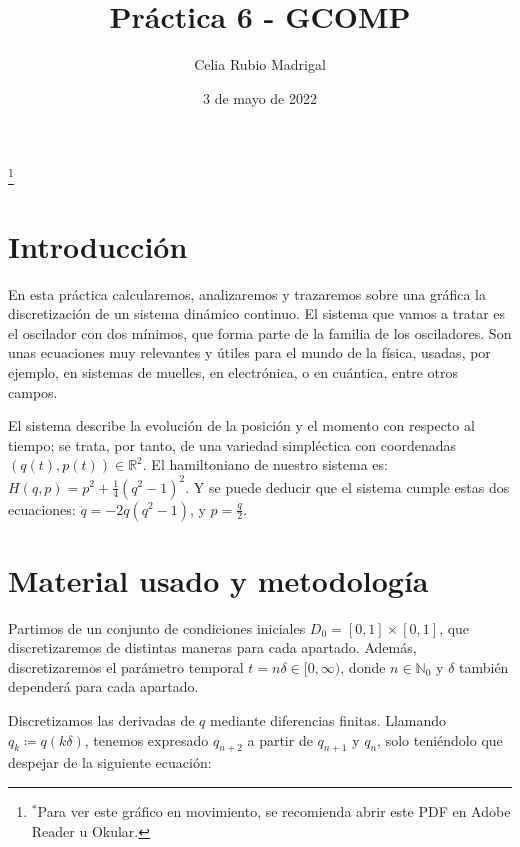 \documentclass[a4paper]{article}
\author{Celia Rubio Madrigal}
\title{Práctica 6 - GCOMP}
\date{3 de mayo de 2022}
\begin{document}
	\maketitle
	
	\tableofcontents
	
	\vfill
	
	\begin{center}
		\renewcommand{\thefootnote}{}\footnote{$^*$Para ver este gráfico en movimiento, se recomienda abrir este PDF en Adobe Reader u Okular.}
	\end{center}
	
	
	\vfill
	\newpage
	
	\section{Introducción}
	En esta práctica calcularemos, analizaremos y trazaremos sobre una gráfica la discretización de un sistema dinámico continuo. El sistema que vamos a tratar es el oscilador con dos mínimos, que forma parte de la familia de los osciladores. Son unas ecuaciones muy relevantes y útiles para el mundo de la física, usadas, por ejemplo, en sistemas de muelles, en electrónica, o en cuántica, entre otros campos.
	
	El sistema describe la evolución de la posición y el momento con respecto al tiempo; se trata, por tanto, de una variedad simpléctica con coordenadas $(q(t),p(t))\in\mathbb{R}^2$. El hamiltoniano de nuestro sistema es: $ H(q,p) = p^2 + \frac{1}{4} (q^2-1)^2 $. Y se puede deducir que el sistema cumple estas dos ecuaciones: $ \ddot{q} = -2q(q^2-1)$, y $p = \frac{\dot{q}}{2} $.
	
	
	\section{Material usado y metodología}
	Partimos de un conjunto de condiciones iniciales $D_0=[0,1]\times[0,1]$, que discretizaremos de distintas maneras para cada apartado. Además, discretizaremos el parámetro temporal $t = n\delta\in[0,\infty)$, donde $n\in\mathbb{N}_0$ y $\delta$ también dependerá para cada apartado.
	
	Discretizamos las derivadas de $q$ mediante diferencias finitas. Llamando $q_k \coloneqq q(k\delta)$, tenemos expresado $q_{n+2}$ a partir de $q_{n+1}$ y $q_n$, solo teniéndolo que despejar de la siguiente ecuación:
	
	
\end{document}
